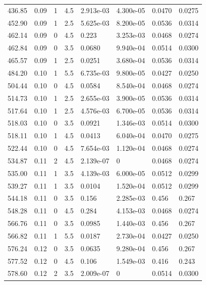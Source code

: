 \documentclass[preview]{standalone}
\begin{document}
{{{\begin{tabular}{L{1.2cm}C{1.2cm} C{0.3cm}C{0.5cm} C{1.4cm}C{1.4cm} C{1.4cm}C{1.4cm}}
  436.85  &  0.09  & 1     & 4.5 &  2.913e-03  & 4.300e-05  & 0.0470 &  0.0275   \\ 
  452.90  &  0.09  & 1     & 2.5 &  5.625e-03  & 8.200e-05  & 0.0536 &  0.0314   \\ 
  462.14  &  0.09  & 0     & 4.5 &  0.223  & 3.253e-03  & 0.0468 &  0.0274   \\ 
  462.84  &  0.09  & 0     & 3.5 &  0.0680  & 9.940e-04  & 0.0514 &  0.0300   \\ 
  465.57  &  0.09  & 1     & 2.5 &  0.0251  & 3.680e-04  & 0.0536 &  0.0314   \\ 
  484.20  &  0.10  & 1     & 5.5 &  6.735e-03  & 9.800e-05  & 0.0427 &  0.0250   \\ 
  504.44  &  0.10  & 0     & 4.5 &  0.0584  & 8.540e-04  & 0.0468 &  0.0274   \\ 
  514.73  &  0.10  & 1     & 2.5 &  2.655e-03  & 3.900e-05  & 0.0536 &  0.0314   \\ 
  517.64  &  0.10  & 1     & 2.5 &  4.576e-03  & 6.700e-05  & 0.0536 &  0.0314   \\ 
  518.03  &  0.10  & 0     & 3.5 &  0.0921  & 1.346e-03  & 0.0514 &  0.0300   \\ 
  518.11  &  0.10  & 1     & 4.5 &  0.0413  & 6.040e-04  & 0.0470 &  0.0275   \\ 
  522.44  &  0.10  & 0     & 4.5 &  7.654e-03  & 1.120e-04  & 0.0468 &  0.0274   \\ 
  534.87  &  0.11  & 2     & 4.5 &  2.139e-07  & 0  & 0.0468 &  0.0274   \\ 
  535.00  &  0.11  & 1     & 3.5 &  4.139e-03  & 6.000e-05  & 0.0512 &  0.0299   \\ 
  539.27  &  0.11  & 1     & 3.5 &  0.0104  & 1.520e-04  & 0.0512 &  0.0299   \\ 
  544.18  &  0.11  & 0     & 3.5 &  0.156  & 2.285e-03  & 0.456 &  0.267   \\ 
  548.28  &  0.11  & 0     & 4.5 &  0.284  & 4.153e-03  & 0.0468 &  0.0274   \\ 
  566.76  &  0.11  & 0     & 3.5 &  0.0985  & 1.440e-03  & 0.456 &  0.267   \\ 
  566.82  &  0.11  & 1     & 5.5 &  0.0187  & 2.730e-04  & 0.0427 &  0.0250   \\ 
  576.24  &  0.12  & 0     & 3.5 &  0.0635  & 9.280e-04  & 0.456 &  0.267   \\ 
  577.52  &  0.12  & 0     & 4.5 &  0.106  & 1.549e-03  & 0.416 &  0.243   \\ 
  578.60  &  0.12  & 2     & 3.5 &  2.009e-07  & 0  & 0.0514 &  0.0300   \\ 

\end{tabular}}}}
\end{document}
